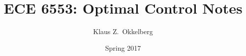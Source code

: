 \documentclass[letterpaper,12pt,titlepage]{report}
\theoremstyle{plain}
\theoremstyle{definition}
\begin{document}
\hypersetup{pageanchor=false}
\title{ECE 6553: Optimal Control Notes}
\author{Klaus Z.\ Okkelberg}
\date{Spring 2017}
\maketitle

\hypersetup{pageanchor=true}

\tableofcontents





\end{document}
